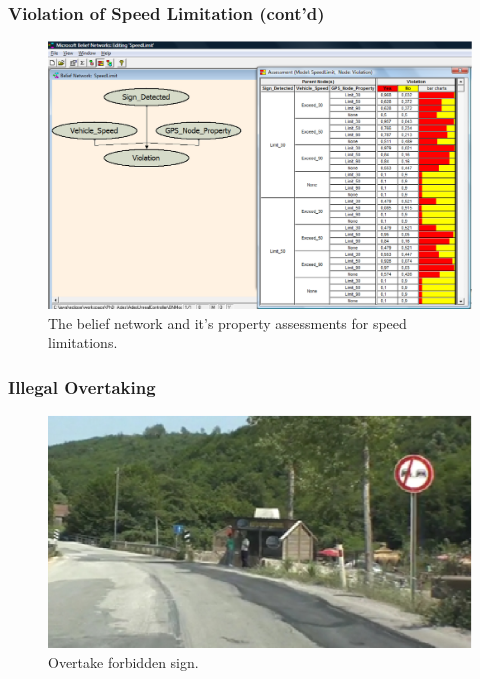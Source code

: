 \documentclass{beamer}
\begin{document}
\begin{frame}[fragile]
	\frametitle{Violation of Speed Limitation (cont'd)}
	\begin{figure}[ht]
	\begin{center}
	\includegraphics[width=.6\paperwidth]{../img/speed_bn.eps}
	\caption{The belief network and it's property assessments for speed limitations.}
	\label{fig:bnspeed}
	\end{center}
	\end{figure}
\end{frame}


\begin{frame}[fragile]
	\frametitle{Illegal Overtaking}
	\begin{figure}[ht]
	\begin{center}
	\includegraphics[width=.5\paperwidth]{../img/otfb.eps}
	\caption{Overtake forbidden sign.}
	\label{fig:otfb}
	\end{center}
	\end{figure}	
\end{frame}
\end{document}
